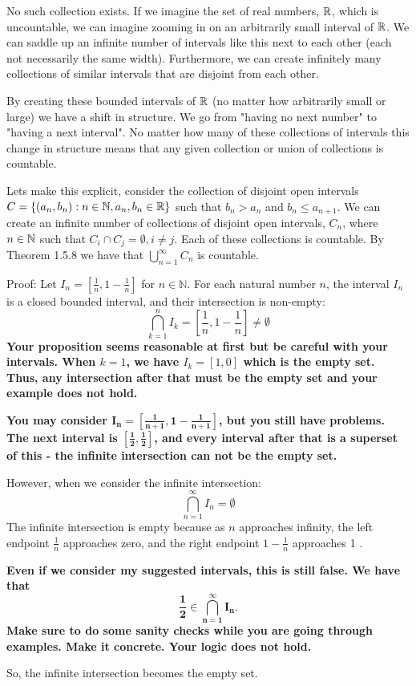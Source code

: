 \documentclass{report}
\begin{document}
No such collection exists. If we imagine the set of real numbers, $\RR$, which is uncountable, we can imagine zooming in on an arbitrarily small interval of $\RR$. We can saddle up an infinite number of intervals like this next to each other (each not necessarily the same width). Furthermore, we can create infinitely many collections of similar intervals that are disjoint from each other.
\par
By creating these bounded intervals of $\RR$ (no matter how arbitrarily small or large) we have a shift in structure. We go from "having no next number" to "having a next interval". No matter how many of these collections of intervals this change in structure means that any given collection or union of collections is countable.
\par
Lets make this explicit, consider the collection of disjoint open intervals $C =\{(a_n,b_n): n \in \NN, a_n,b_n \in \RR \}$ such that $b_n > a_n$ and $ b_n \leq a_{n+1}$. We can create an infinite number of collections of disjoint open intervals, $C_n$, where $n \in \NN$ such that $C_i \cap C_j = \emptyset, i \neq  j$.  Each of these collections is countable. By Theorem 1.5.8 we have that $\bigcup_{n =1}^{\infty} C_n $ is countable.


Proof: Let $I_n=\left[\frac{1}{n}, 1-\frac{1}{n}\right]$ for $n \in \mathbb{N}$.
For each natural number $n$, the interval $I_n$ is a closed bounded interval, and their intersection is non-empty:
$$
\bigcap_{k=1}^n I_k=\left[\frac{1}{n}, 1-\frac{1}{n}\right] \neq \emptyset
$$
\textbf{
  Your proposition seems reasonable at first but be careful with your intervals. When $k=1$, we have $I_k = \left[1,0 \right]$ which is the empty set. Thus, any intersection after that must be the empty set and your example does not hold.}
  \par
  \textbf{You may consider $\mathbf{I_n=\left[\frac{1}{n+1}, 1-\frac{1}{n+1} \right]}$, but you still have problems. The next interval is $\mathbf{\left[\frac{1}{2}, \frac{1}{2}\right]}$, and every interval after that is a superset of this - the infinite intersection can not be the empty set.
}
\par\bigskip
However, when we consider the infinite intersection:
$$
\bigcap_{n=1}^{\infty} I_n=\emptyset
$$
The infinite intersection is empty because as $n$ approaches infinity, the left endpoint $\frac{1}{n}$ approaches zero, and the right endpoint $1-\frac{1}{n}$ approaches 1 . 

\par
\textbf{
Even if we consider my suggested intervals, this is still false. We have that  $$\mathbf{ \frac{1}{2} \in  \bigcap_{n=1}^{\infty} I_n}.$$ Make sure to do some sanity checks while you are going through examples. Make it concrete. Your logic does not hold. 
}

So, the infinite intersection becomes the empty set.
\end{document}
